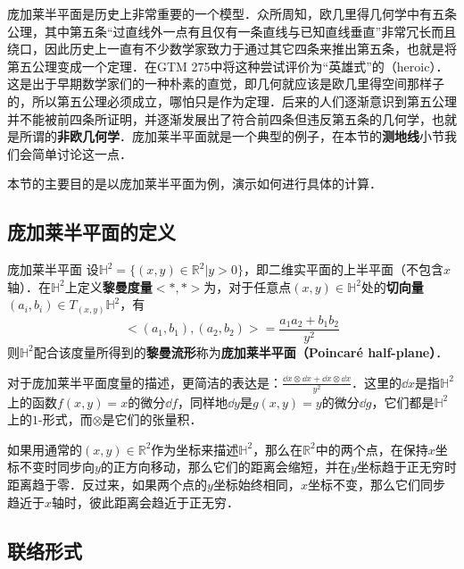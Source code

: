 
庞加莱半平面是历史上非常重要的一个模型．众所周知，欧几里得几何学中有五条公理，其中第五条“过直线外一点有且仅有一条直线与已知直线垂直”非常冗长而且绕口，因此历史上一直有不少数学家致力于通过其它四条来推出第五条，也就是将第五公理变成一个定理．在GTM 275\cite{GTM275}中将这种尝试评价为“英雄式”的（heroic）．这是出于早期数学家们的一种朴素的直觉，即几何就应该是欧几里得空间那样子的，所以第五公理必须成立，哪怕只是作为定理．后来的人们逐渐意识到第五公理并不能被前四条所证明，并逐渐发展出了符合前四条但违反第五条的几何学，也就是所谓的\textbf{非欧几何学}．庞加莱半平面就是一个典型的例子，在本节的\textbf{测地线}小节我们会简单讨论这一点．

本节的主要目的是以庞加莱半平面为例，演示如何进行具体的计算．

\subsection{庞加莱半平面的定义}

\begin{definition}{庞加莱半平面}
设$\mathbb{H}^2=\{(x, y)\in \mathbb{R}^2|y>0\}$，即二维实平面的上半平面（不包含$x$轴）．在$\mathbb{H}^2$上定义\textbf{黎曼度量}$<*,*>$为，对于任意点$(x, y)\in \mathbb{H}^2$处的\textbf{切向量}$(a_i, b_i)\in T_{(x, y)}\mathbb{H}^2$，有
\begin{equation}
<(a_1, b_1), (a_2, b_2)>=\frac{a_1a_2+b_1b_2}{y^2}
\end{equation}
则$\mathbb{H}^2$配合该度量所得到的\textbf{黎曼流形}称为\textbf{庞加莱半平面（Poincaré half-plane）}．
\end{definition}

对于庞加莱半平面度量的描述，更简洁的表达是：$\frac{\dd x\otimes \dd x+ \dd x\otimes\dd x}{y^2}$．这里的$\dd x$是指$\mathbb{H}^2$上的函数$f(x, y)=x$的微分$\dd f$，同样地$\dd y$是$g(x, y)=y$的微分$\dd g$，它们都是$\mathbb{H}^2$上的$1$-形式，而$\otimes$是它们的张量积．

如果用通常的$(x, y)\in \mathbb{R}^2$作为坐标来描述$\mathbb{H}^2$，那么在$\mathbb{R}^2$中的两个点，在保持$x$坐标不变时同步向$y$的正方向移动，那么它们的距离会缩短，并在$y$坐标趋于正无穷时距离趋于零．反过来，如果两个点的$y$坐标始终相同，$x$坐标不变，那么它们同步趋近于$x$轴时，彼此距离会趋近于正无穷．

\subsection{联络形式}

